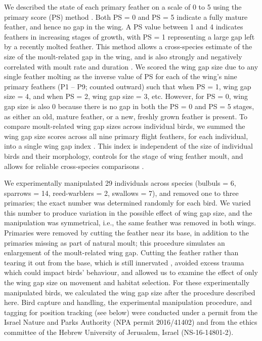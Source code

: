 We described the state of each primary feather on a scale of 0 to 5 using the primary score (PS) method \citep{ginn1983}.
Both PS = 0 and PS = 5 indicate a fully mature feather, and hence no gap in the wing.
A PS value between 1 and 4 indicates feathers in increasing stages of growth, with PS = 1 representing a large gap left by a recently molted feather.
This method allows a cross-species estimate of the size of the moult-related gap in the wing, and is also strongly and negatively correlated with moult rate and duration \citep{rohwer2009}.
We scored the wing gap size due to any single feather molting as the inverse value of PS for each of the wing's nine primary feathers (P1 -- P9; counted outward) such that when PS = 1, wing gap size = 4, and when PS = 2, wing gap size = 3, etc.
However, for PS = 0, wing gap size is also 0 because there is no gap in both the PS = 0 and PS = 5 stages, as either an old, mature feather, or a new, freshly grown feather is present.
To compare moult-related wing gap sizes across individual birds, we summed the wing gap size scores across all nine primary flight feathers, for each individual, into a single wing gap index \citep{kiat2016}.
This index is independent of the size of individual birds and their morphology, controls for the stage of wing feather moult, and allows for reliable cross-species comparisons \citep{bensch1993,kiat2016}.

We experimentally manipulated 29 individuals across species {(bulbuls = 6, sparrows = 14, reed-warblers = 2, swallows = 7)}, and removed one to three primaries; the exact number was determined randomly for each bird.
We varied this number to produce variation in the possible effect of wing gap size, and the manipulation was symmetrical, i.e., the same feather was removed in both wings.
Primaries were removed by cutting the feather near its base, in addition to the primaries missing as part of natural moult; this procedure simulates an enlargement of the moult-related wing gap.
Cutting the feather rather than tearing it out from the base, which is still innervated \parencite{jenni2020}, avoided excess trauma which could impact birds' behaviour, and allowed us to examine the effect of only the wing gap size on movement and habitat selection.
For these experimentally manipulated birds, we calculated the wing gap size after the procedure described here.
Bird capture and handling, the experimental manipulation procedure, and tagging for position tracking (see below) were conducted under a permit from the Israel Nature and Parks Authority (NPA permit 2016/41402) and from the ethics committee of the Hebrew University of Jerusalem, Israel (NS-16-14801-2).


